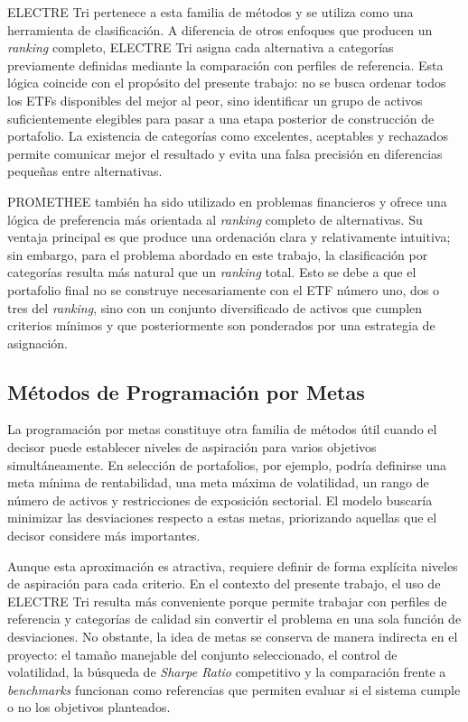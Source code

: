 \documentclass[12pt,letterpaper]{article}
\begin{document}
ELECTRE Tri pertenece a esta familia de métodos y se utiliza como una herramienta de clasificación. A diferencia de otros enfoques que producen un \textit{ranking} completo, ELECTRE Tri asigna cada alternativa a categorías previamente definidas mediante la comparación con perfiles de referencia. Esta lógica coincide con el propósito del presente trabajo: no se busca ordenar todos los ETFs disponibles del mejor al peor, sino identificar un grupo de activos suficientemente elegibles para pasar a una etapa posterior de construcción de portafolio. La existencia de categorías como excelentes, aceptables y rechazados permite comunicar mejor el resultado y evita una falsa precisión en diferencias pequeñas entre alternativas.

PROMETHEE también ha sido utilizado en problemas financieros y ofrece una lógica de preferencia más orientada al \textit{ranking} completo de alternativas. Su ventaja principal es que produce una ordenación clara y relativamente intuitiva; sin embargo, para el problema abordado en este trabajo, la clasificación por categorías resulta más natural que un \textit{ranking} total. Esto se debe a que el portafolio final no se construye necesariamente con el ETF número uno, dos o tres del \textit{ranking}, sino con un conjunto diversificado de activos que cumplen criterios mínimos y que posteriormente son ponderados por una estrategia de asignación.

\subsection{Métodos de Programación por Metas}

La programación por metas constituye otra familia de métodos útil cuando el decisor puede establecer niveles de aspiración para varios objetivos simultáneamente. En selección de portafolios, por ejemplo, podría definirse una meta mínima de rentabilidad, una meta máxima de volatilidad, un rango de número de activos y restricciones de exposición sectorial. El modelo buscaría minimizar las desviaciones respecto a estas metas, priorizando aquellas que el decisor considere más importantes.

Aunque esta aproximación es atractiva, requiere definir de forma explícita niveles de aspiración para cada criterio. En el contexto del presente trabajo, el uso de ELECTRE Tri resulta más conveniente porque permite trabajar con perfiles de referencia y categorías de calidad sin convertir el problema en una sola función de desviaciones. No obstante, la idea de metas se conserva de manera indirecta en el proyecto: el tamaño manejable del conjunto seleccionado, el control de volatilidad, la búsqueda de \textit{Sharpe Ratio} competitivo y la comparación frente a \textit{benchmarks} funcionan como referencias que permiten evaluar si el sistema cumple o no los objetivos planteados.
\end{document}
